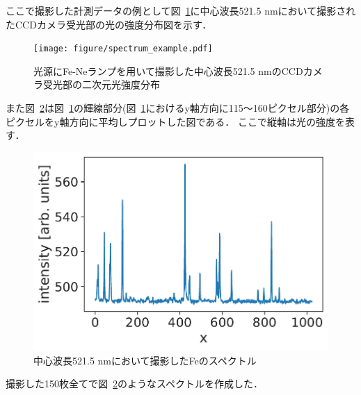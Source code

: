 ここで撮影した計測データの例として図\ \ref{fig:spectrum_example}に中心波長521.5 nmにおいて撮影されたCCDカメラ受光部の光の強度分布図を示す．
\begin{figure}[htbp]
    \centering
    \texttt{[image: figure/spectrum\_example.pdf]}
    \caption{光源にFe-Neランプを用いて撮影した中心波長521.5 nmのCCDカメラ受光部の二次元光強度分布}
    \label{fig:spectrum_example}
\end{figure}
また図\ \ref{fig:spectrum_example2}は図\ \ref{fig:spectrum_example}の輝線部分(図\ \ref{fig:spectrum_example}におけるy軸方向に115～160ピクセル部分)の各ピクセルをy軸方向に平均しプロットした図である．
ここで縦軸は光の強度を表す．
\begin{figure}[htbp]
    \centering
    \includegraphics[scale=0.8]{figure/spectrum_example2.pdf}
    \caption{中心波長521.5 nmにおいて撮影したFeのスペクトル}
    \label{fig:spectrum_example2}
\end{figure}
撮影した150枚全てで図\ \ref{fig:spectrum_example2}のようなスペクトルを作成した．

